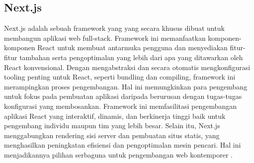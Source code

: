 \subsection{Next.js}
Next.js adalah sebuah framework yang yang secara khusus dibuat untuk membangun aplikasi web full-stack. Framework ini memanfaatkan komponen-komponen React untuk membuat antarmuka pengguna dan menyediakan fitur-fitur tambahan serta pengoptimalan yang lebih dari apa yang ditawarkan oleh React konvensional. Dengan mengabstraksi dan secara otomatis mengkonfigurasi tooling penting untuk React, seperti bundling dan compiling, framework ini merampingkan proses pengembangan. Hal ini memungkinkan para pengembang untuk fokus pada pembuatan aplikasi daripada berurusan dengan tugas-tugas konfigurasi yang membosankan. Framework ini memfasilitasi pengembangan aplikasi React yang interaktif, dinamis, dan berkinerja tinggi baik untuk pengembang individu maupun tim yang lebih besar. Selain itu, Next.js menggabungkan rendering sisi server dan pembuatan situs statis, yang menghasilkan peningkatan efisiensi dan pengoptimalan mesin pencari. Hal ini menjadikannya pilihan serbaguna untuk pengembangan web kontemporer \citep{nextjs2025documentation}.
